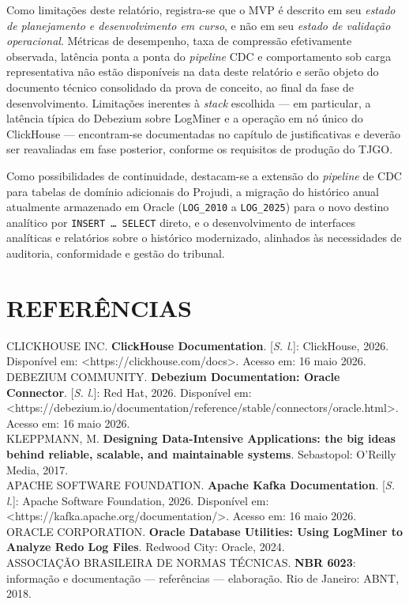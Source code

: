 \documentclass[12pt,letterpaper,oneside]{report}
\begin{document}
Como limitações deste relatório, registra-se que o MVP é descrito em seu \textit{estado de planejamento e desenvolvimento em curso}, e não em seu \textit{estado de validação operacional}. Métricas de desempenho, taxa de compressão efetivamente observada, latência ponta a ponta do \textit{pipeline} CDC e comportamento sob carga representativa não estão disponíveis na data deste relatório e serão objeto do documento técnico consolidado da prova de conceito, ao final da fase de desenvolvimento. Limitações inerentes à \textit{stack} escolhida — em particular, a latência típica do Debezium sobre LogMiner e a operação em nó único do ClickHouse — encontram-se documentadas no capítulo de justificativas e deverão ser reavaliadas em fase posterior, conforme os requisitos de produção do TJGO.

Como possibilidades de continuidade, destacam-se a extensão do \textit{pipeline} de CDC para tabelas de domínio adicionais do Projudi, a migração do histórico anual atualmente armazenado em Oracle (\texttt{LOG\_2010} a \texttt{LOG\_2025}) para o novo destino analítico por \texttt{INSERT \dots\ SELECT} direto, e o desenvolvimento de interfaces analíticas e relatórios sobre o histórico modernizado, alinhados às necessidades de auditoria, conformidade e gestão do tribunal.


\chapter*{REFERÊNCIAS}

\noindent CLICKHOUSE INC. \textbf{ClickHouse Documentation}. [\textit{S. l.}]: ClickHouse, 2026. Disponível em: <https://clickhouse.com/docs>. Acesso em: 16 maio 2026. \\

\noindent DEBEZIUM COMMUNITY. \textbf{Debezium Documentation: Oracle Connector}. [\textit{S. l.}]: Red Hat, 2026. Disponível em: <https://debezium.io/documentation/reference/stable/connectors/oracle.html>. Acesso em: 16 maio 2026. \\

\noindent KLEPPMANN, M. \textbf{Designing Data-Intensive Applications: the big ideas behind reliable, scalable, and maintainable systems}. Sebastopol: O'Reilly Media, 2017. \\

\noindent APACHE SOFTWARE FOUNDATION. \textbf{Apache Kafka Documentation}. [\textit{S. l.}]: Apache Software Foundation, 2026. Disponível em: <https://kafka.apache.org/documentation/>. Acesso em: 16 maio 2026. \\

\noindent ORACLE CORPORATION. \textbf{Oracle Database Utilities: Using LogMiner to Analyze Redo Log Files}. Redwood City: Oracle, 2024. \\

\noindent ASSOCIAÇÃO BRASILEIRA DE NORMAS TÉCNICAS. \textbf{NBR 6023}: informação e documentação — referências — elaboração. Rio de Janeiro: ABNT, 2018.

\clearpage
\end{document}
